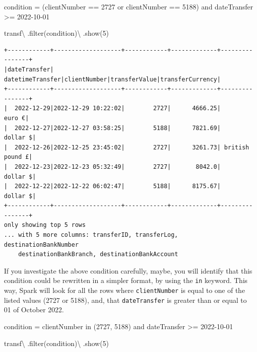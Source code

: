 \documentclass[
  11pt,
  letterpaper,
  DIV=11,
  numbers=noendperiod]{scrreprt}
\newenvironment{Shaded}{\begin{snugshade}}{\end{snugshade}}
\newcommand{\BuiltInTok}[1]{\textcolor[rgb]{0.00,0.23,0.31}{#1}}
\newcommand{\DecValTok}[1]{\textcolor[rgb]{0.68,0.00,0.00}{#1}}
\newcommand{\NormalTok}[1]{\textcolor[rgb]{0.00,0.23,0.31}{#1}}
\newcommand{\OperatorTok}[1]{\textcolor[rgb]{0.37,0.37,0.37}{#1}}
\newcommand{\StringTok}[1]{\textcolor[rgb]{0.13,0.47,0.30}{#1}}
\begin{document}
\begin{Shaded}
\begin{Highlighting}[]
\NormalTok{condition }\OperatorTok{=} \StringTok{\textquotesingle{}\textquotesingle{}\textquotesingle{}}
\StringTok{  (clientNumber == 2727 or clientNumber == 5188)}
\StringTok{  and dateTransfer \textgreater{}= \textquotesingle{}2022{-}10{-}01\textquotesingle{}}
\StringTok{\textquotesingle{}\textquotesingle{}\textquotesingle{}}

\NormalTok{transf}\OperatorTok{\textbackslash{}}
\NormalTok{  .}\BuiltInTok{filter}\NormalTok{(condition)}\OperatorTok{\textbackslash{}}
\NormalTok{  .show(}\DecValTok{5}\NormalTok{)}
\end{Highlighting}
\end{Shaded}

\begin{verbatim}
+------------+-------------------+------------+-------------+----------------+
|dateTransfer|   datetimeTransfer|clientNumber|transferValue|transferCurrency|
+------------+-------------------+------------+-------------+----------------+
|  2022-12-29|2022-12-29 10:22:02|        2727|      4666.25|          euro €|
|  2022-12-27|2022-12-27 03:58:25|        5188|      7821.69|        dollar $|
|  2022-12-26|2022-12-25 23:45:02|        2727|      3261.73| british pound £|
|  2022-12-23|2022-12-23 05:32:49|        2727|       8042.0|        dollar $|
|  2022-12-22|2022-12-22 06:02:47|        5188|      8175.67|        dollar $|
+------------+-------------------+------------+-------------+----------------+
only showing top 5 rows
... with 5 more columns: transferID, transferLog, destinationBankNumber
    destinationBankBranch, destinationBankAccount
\end{verbatim}

If you investigate the above condition carefully, maybe, you will
identify that this condition could be rewritten in a simpler format, by
using the \texttt{in} keyword. This way, Spark will look for all the
rows where \texttt{clientNumber} is equal to one of the listed values
(2727 or 5188), and, that \texttt{dateTransfer} is greater than or equal
to 01 of October 2022.

\begin{Shaded}
\begin{Highlighting}[]
\NormalTok{condition }\OperatorTok{=} \StringTok{\textquotesingle{}\textquotesingle{}\textquotesingle{}}
\StringTok{  clientNumber in (2727, 5188)}
\StringTok{  and dateTransfer \textgreater{}= \textquotesingle{}2022{-}10{-}01\textquotesingle{}}
\StringTok{\textquotesingle{}\textquotesingle{}\textquotesingle{}}

\NormalTok{transf}\OperatorTok{\textbackslash{}}
\NormalTok{  .}\BuiltInTok{filter}\NormalTok{(condition)}\OperatorTok{\textbackslash{}}
\NormalTok{  .show(}\DecValTok{5}\NormalTok{)}
\end{Highlighting}
\end{Shaded}
\end{document}
